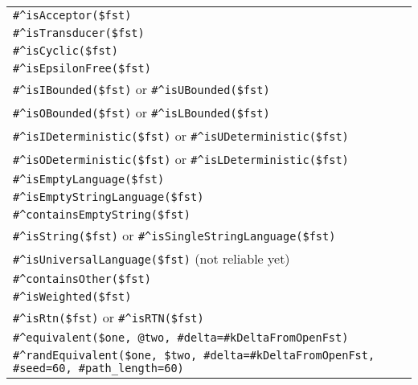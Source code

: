 \begin{tabular}{|p{13cm}|}
\hline
\verb!#^isAcceptor($fst)!\\
\verb!#^isTransducer($fst)!\\
\verb!#^isCyclic($fst)!\\
\verb!#^isEpsilonFree($fst)!\\
\verb!#^isIBounded($fst)! or \verb!#^isUBounded($fst)!\\
\verb!#^isOBounded($fst)! or \verb!#^isLBounded($fst)!\\
\verb!#^isIDeterministic($fst)! or \verb!#^isUDeterministic($fst)!\\
\verb!#^isODeterministic($fst)! or \verb!#^isLDeterministic($fst)!\\
\hline
\verb!#^isEmptyLanguage($fst)!\\
\verb!#^isEmptyStringLanguage($fst)!\\
\verb!#^containsEmptyString($fst)!\\
\verb!#^isString($fst)! or \verb!#^isSingleStringLanguage($fst)!\\
\verb!#^isUniversalLanguage($fst)! (not reliable yet)\\
\hline
\verb!#^containsOther($fst)!\\
\verb!#^isWeighted($fst)!\\
\verb!#^isRtn($fst)! or \verb!#^isRTN($fst)!\\
\hline
\verb!#^equivalent($one, @two, #delta=#kDeltaFromOpenFst)!\\
\verb!#^randEquivalent($one, $two, #delta=#kDeltaFromOpenFst,! \verb!#seed=60, #path_length=60)!\\
\hline
\end{tabular}

